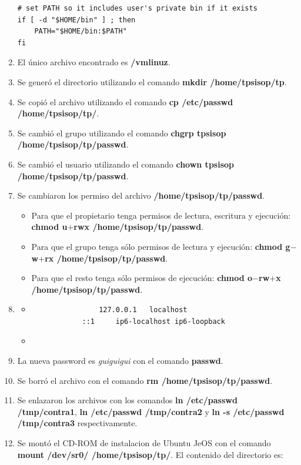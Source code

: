 \documentclass[a4paper,11pt] {article}
\begin{document}
\begin{enumerate}
\begin{verbatim}
# set PATH so it includes user's private bin if it exists
if [ -d "$HOME/bin" ] ; then
    PATH="$HOME/bin:$PATH"
fi
	\end{verbatim}
	\item El único archivo encontrado es \textbf{/vmlinuz}.
	\item Se generó el directorio utilizando el comando \textbf{mkdir /home/tpsisop/tp}.
	\item Se copió el archivo utilizando el comando \textbf{cp /etc/passwd /home/tpsisop/tp/}.
	\item Se cambió el grupo utilizando el comando \textbf{chgrp tpsisop /home/tpsisop/tp/passwd}.
	\item Se cambió el usuario utilizando el comando \textbf{chown tpsisop /home/tpsisop/tp/passwd}.
	\item Se cambiaron los permiso del archivo \textbf{/home/tpsisop/tp/passwd}.
		\begin{itemize}
			\item Para que el propietario tenga permisos de lectura, escritura y ejecución: \textbf{chmod u$+$rwx /home/tpsisop/tp/passwd}.
			\item Para que el grupo tenga sólo permisos de lectura y ejecución: \textbf{chmod g$-$w$+$rx /home/tpsisop/tp/passwd}.
			\item Para que el resto tenga sólo permisos de ejecución: \textbf{chmod o$-$rw$+$x /home/tpsisop/tp/passwd}.
		\end{itemize}
	\item 
		\begin{itemize}
		 \item 	
			\begin{verbatim}
	 			127.0.0.1	localhost
			::1     ip6-localhost ip6-loopback
			\end{verbatim}
		 \item 	
		\end{itemize}
	\item La nueva password es \textit{guiguigui} con el comando \textbf{passwd}.
	\item Se borró el archivo con el comando \textbf{rm /home/tpsisop/tp/passwd}.
	\item Se enlazaron los archivos con los comandos \textbf{ln /etc/passwd /tmp/contra1}, \textbf{ln /etc/passwd /tmp/contra2} y \textbf{ln -s /etc/passwd /tmp/contra3} respectivamente.
	\item Se montó el CD-ROM de instalacion de Ubuntu JeOS con el comando \textbf{mount /dev/sr0/ /home/tpsisop/tp/}. El contenido del directorio es:

\end{enumerate}
\end{document}
